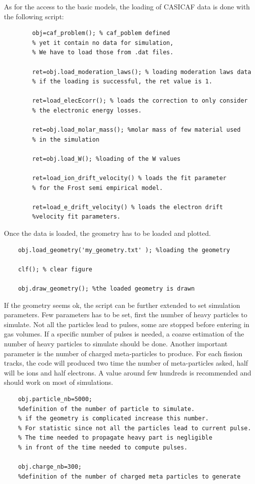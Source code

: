 \documentclass[10pt]{article}
\begin{document}
	
	As for the access to the basic models, the loading of CASICAF data is done with the following script:
	
	\begin{lstlisting}
		obj=caf_problem(); % caf_poblem defined
		% yet it contain no data for simulation,
		% We have to load those from .dat files.
		
		ret=obj.load_moderation_laws(); % loading moderation laws data
		% if the loading is successful, the ret value is 1.
		
		ret=load_elecEcorr(); % loads the correction to only consider
		% the electronic energy losses.
		
		ret=obj.load_molar_mass(); %molar mass of few material used 
		% in the simulation
		
		ret=obj.load_W(); %loading of the W values
		
		ret=load_ion_drift_velocity() % loads the fit parameter
		% for the Frost semi empirical model.
		
		ret=load_e_drift_velocity() % loads the electron drift
		%velocity fit parameters.
	\end{lstlisting}
	
	
	Once the data is loaded, the geometry has to be loaded and plotted.
	
	\begin{lstlisting}
	obj.load_geometry('my_geometry.txt' ); %loading the geometry
	
	clf(); % clear figure
	
	obj.draw_geometry(); %the loaded geometry is drawn
	\end{lstlisting}
	
	If the geometry seems ok, the script can be further extended to set 
	simulation parameters. Few parameters has to be set, first the number of heavy particles to simulate. Not all the particles lead to pulses, some are stopped before entering in gas volumes. If a specific number of pulses is needed, a coarse estimation of the number of heavy particles to simulate should be done. Another important parameter is the number of charged meta-particles to produce. For each fission tracks, the code will produced two time the number of meta-particles asked, half will be ions and half electrons. A value around few hundreds is recommended and should work on most of simulations. 
	
	\begin{lstlisting}
	obj.particle_nb=5000;
	%definition of the number of particle to simulate.
	% if the geometry is complicated increase this number.
	% For statistic since not all the particles lead to current pulse.
	% The time needed to propagate heavy part is negligible
	% in front of the time needed to compute pulses.
	
	obj.charge_nb=300;
	%definition of the number of charged meta particles to generate
	\end{lstlisting}
	
\end{document}

